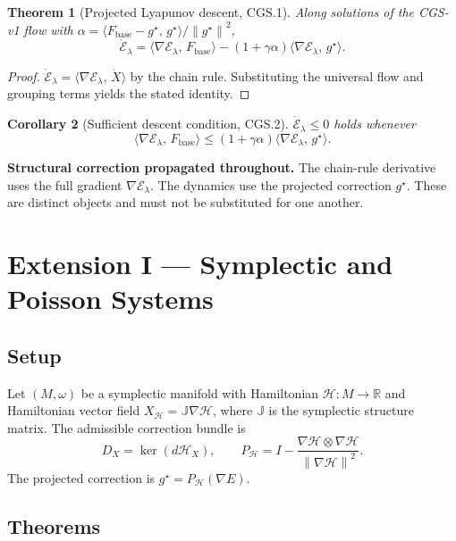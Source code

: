 \documentclass[11pt,a4paper]{article}
\newtheorem{theorem}{Theorem}[section]
\newtheorem{corollary}[theorem]{Corollary}
\theoremstyle{definition}
\newcommand{\Fbase}{F_{\mathrm{base}}}
\newcommand{\R}{\mathbb{R}}
\newcommand{\norm}[1]{\left\|#1\right\|}
\newcommand{\inner}[2]{\langle #1,\,#2\rangle}
\begin{document}
\begin{theorem}[Projected Lyapunov descent, CGS.1]
\label{thm:cgs1}
Along solutions of the CGS-v1 flow with $\alpha = \inner{\Fbase - g^\star}{g^\star}/\norm{g^\star}^2$,
\[
\dot{\mathcal{E}}_\lambda
= \inner{\nabla \mathcal{E}_\lambda}{\Fbase}
- (1 + \gamma \alpha)\inner{\nabla \mathcal{E}_\lambda}{g^\star}.
\]
\end{theorem}

\begin{proof}
$\dot{\mathcal{E}}_\lambda = \inner{\nabla \mathcal{E}_\lambda}{\dot X}$ by the chain rule. Substituting the universal flow and grouping terms yields the stated identity.
\end{proof}

\begin{corollary}[Sufficient descent condition, CGS.2]
$\dot{\mathcal{E}}_\lambda \leq 0$ holds whenever
\[
\inner{\nabla \mathcal{E}_\lambda}{\Fbase} \leq (1 + \gamma\alpha)\inner{\nabla \mathcal{E}_\lambda}{g^\star}.
\]
\end{corollary}

\textbf{Structural correction propagated throughout.} The chain-rule derivative uses the full gradient $\nabla \mathcal{E}_\lambda$. The dynamics use the projected correction $g^\star$. These are distinct objects and must not be substituted for one another.

\newpage

\section{Extension I --- Symplectic and Poisson Systems}

\subsection{Setup}

Let $(M, \omega)$ be a symplectic manifold with Hamiltonian $\mathcal{H} : M \to \R$ and Hamiltonian vector field $X_\mathcal{H} = \mathbb{J}\nabla \mathcal{H}$, where $\mathbb{J}$ is the symplectic structure matrix. The admissible correction bundle is
\[
D_X = \ker(d\mathcal{H}_X), \qquad
P_\mathcal{H} = I - \frac{\nabla \mathcal{H} \otimes \nabla \mathcal{H}}{\norm{\nabla \mathcal{H}}^2}.
\]
The projected correction is $g^\star = P_\mathcal{H}(\nabla E)$.

\subsection{Theorems}
\end{document}
